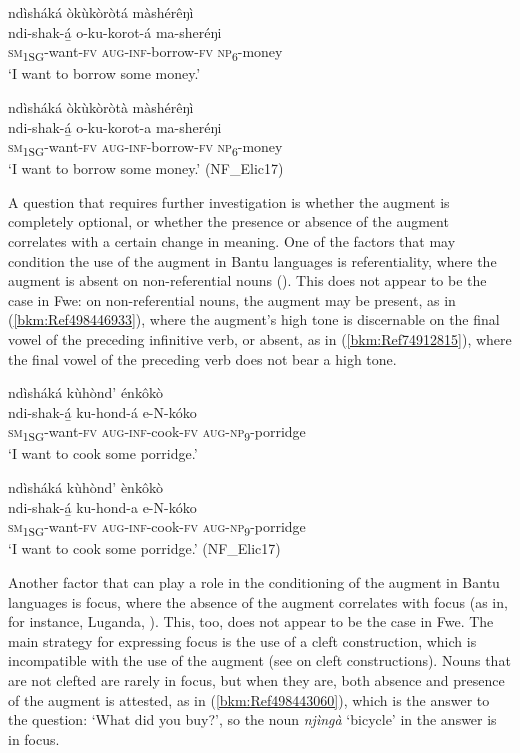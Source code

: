 \ea
\ea    \label{bkm:Ref498435892}
ndìsháká òkùkòròtá màshérêŋì\\
\gll ndi-shak-á̲    o-ku-korot-á    ma-sheréŋi\\
\textsc{sm}\textsubscript{1SG}-want-\textsc{fv}  \textsc{aug}-\textsc{inf}-borrow-\textsc{fv}  \textsc{np}\textsubscript{6}-money\\
\glt ‘I want to borrow some money.’

\ex
\label{bkm:Ref74912770}
ndìsháká òkùkòròtà màshérêŋì\\
\gll ndi-shak-á̲    o-ku-korot-a    ma-sheréŋi\\
\textsc{sm}\textsubscript{1SG}-want-\textsc{fv}  \textsc{aug}-\textsc{inf}-borrow-\textsc{fv}  \textsc{np}\textsubscript{6}-money\\
\glt ‘I want to borrow some money.’ (NF\_Elic17)
\z\z

A question that requires further investigation is whether the augment is completely optional, or whether the presence or absence of the augment correlates with a certain change in meaning. One of the factors that may condition the use of the augment in Bantu languages is referentiality, where the augment is absent on non-referential nouns (\citealt{Velde2019}). This does not appear to be the case in Fwe: on non-referential nouns, the augment may be present, as in (\ref{bkm:Ref498446933}), where the augment’s high tone is discernable on the final vowel of the preceding infinitive verb, or absent, as in (\ref{bkm:Ref74912815}), where the final vowel of the preceding verb does not bear a high tone.

\ea
\label{bkm:Ref498446933}
ndìsháká kùhònd’ énkôkò\\
\gll ndi-shak-á̲    ku-hond-á    e-N-kóko\\
\textsc{sm}\textsubscript{1SG}-want-\textsc{fv}  \textsc{aug}-\textsc{inf}-cook-\textsc{fv}  \textsc{aug}-\textsc{np}\textsubscript{9}-porridge\\
\glt ‘I want to cook some porridge.’
\z

\ea
\label{bkm:Ref74912815}
ndìsháká kùhònd’ ènkôkò\\
\gll ndi-shak-á̲    ku-hond-a    e-N-kóko\\
\textsc{sm}\textsubscript{1SG}-want-\textsc{fv}  \textsc{aug}-\textsc{inf}-cook-\textsc{fv}  \textsc{aug}-\textsc{np}\textsubscript{9}-porridge\\
\glt ‘I want to cook some porridge.’ (NF\_Elic17)
\z

Another factor that can play a role in the conditioning of the augment in Bantu languages is focus, where the absence of the augment correlates with focus (as in, for instance, Luganda, \citealt{HymanKatamba1993}). This, too, does not appear to be the case in Fwe. The main strategy for expressing focus is the use of a cleft construction, which is incompatible with the use of the augment (see  on cleft constructions). Nouns that are not clefted are rarely in focus, but when they are, both absence and presence of the augment is attested, as in (\ref{bkm:Ref498443060}), which is the answer to the question: ‘What did you buy?’, so the noun \textit{njìngà} ‘bicycle’ in the answer is in focus.


